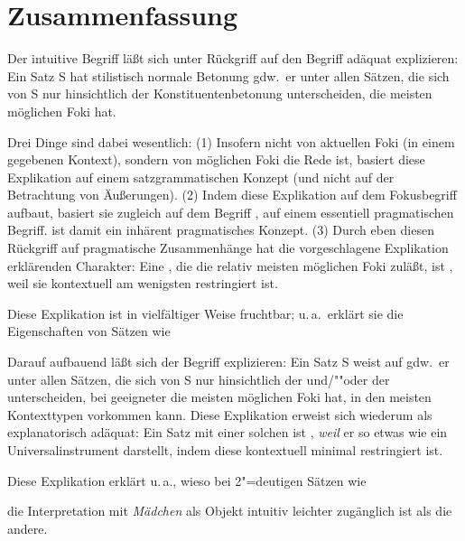 \documentclass[output=paper]{langsci/langscibook}
\begin{document}
\section{Zusammenfassung}
\label{sec:3-4}

Der intuitive Begriff  läßt sich unter
Rückgriff auf den Begriff  adäquat explizieren: Ein Satz
S hat stilistisch normale Betonung gdw.\ er unter allen Sätzen,
die sich von S nur hinsichtlich der Konstituentenbetonung
unterscheiden, die meisten möglichen Foki hat.

Drei Dinge sind dabei wesentlich: (1) Insofern nicht von aktuellen
Foki (in einem gegebenen Kontext), sondern von möglichen Foki die Rede
ist, basiert diese Explikation auf einem satzgrammatischen Konzept
(und nicht auf der Betrachtung von Äußerungen). (2) Indem diese
Explikation auf dem Fokusbegriff aufbaut, basiert sie zugleich auf
dem Begriff , \dash auf einem
essentiell pragmatischen Begriff.  ist damit
ein inhärent pragmatisches Konzept. (3) Durch eben diesen Rückgriff
auf pragmatische Zusammenhänge hat die vorgeschlagene Explikation
erklärenden Charakter: Eine , die die relativ meisten
möglichen Foki zuläßt, ist , weil sie kontextuell am
wenigsten restringiert ist.

Diese Explikation ist in vielfältiger Weise fruchtbar; u.\,a.\ erklärt
sie die Eigenschaften von Sätzen wie
\begin{exe}
\end{exe}
Darauf aufbauend läßt sich der Begriff  explizieren: Ein Satz S weist  auf gdw.\ er unter allen Sätzen, die sich von
S nur hinsichtlich der  und/""oder der 
unterscheiden, bei geeigneter  die meisten möglichen Foki
hat, \dash in den meisten Kontexttypen vorkommen kann. Diese
Explikation erweist sich wiederum als explanatorisch adäquat: Ein
Satz mit einer solchen  ist , \textit{weil} er so
etwas wie ein Universalinstrument darstellt, indem diese 
kontextuell minimal restringiert ist.

Diese Explikation erklärt u.\,a., wieso bei 2"=deutigen Sätzen wie
\begin{exe}
\end{exe}
die Interpretation mit \textit{Mädchen} als Objekt intuitiv leichter zugänglich ist als die andere.
\end{document}
